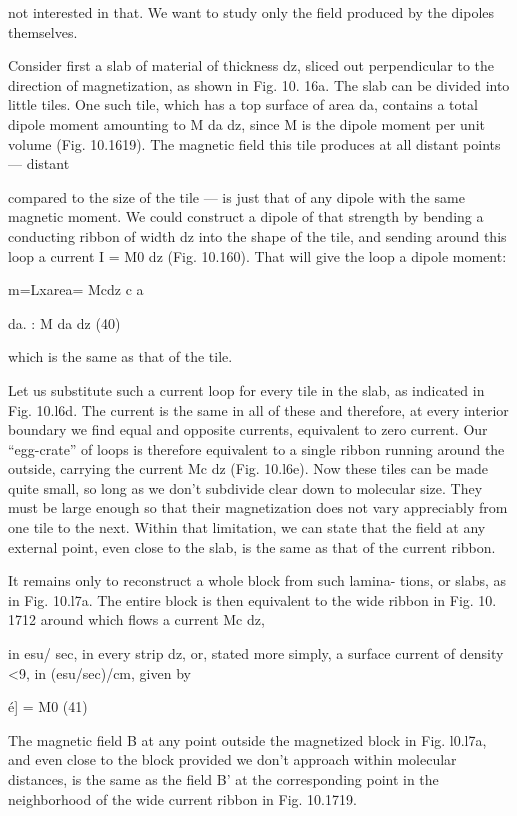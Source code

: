 {{not interested in that. We want to study only the field produced
by the dipoles themselves.

Consider first a slab of material of thickness dz, sliced out perpendicular
to the direction of magnetization, as shown in Fig. 10. 16a.
The slab can be divided into little tiles. One such tile, which has a
top surface of area da, contains a total dipole moment amounting to
M da dz, since M is the dipole moment per unit volume (Fig. 10.1619).
The magnetic field this tile produces at all distant points --- distant

 

 

compared to the size of the tile --- is just that of any dipole with the
same magnetic moment. We could construct a dipole of that
strength by bending a conducting ribbon of width dz into the shape
of the tile, and sending around this loop a current I = M0 dz (Fig.
10.160). That will give the loop a dipole moment:

m=Lxarea= Mcdz
c a

da. : M da dz (40)

which is the same as that of the tile.

Let us substitute such a current loop for every tile in the slab, as
indicated in Fig. 10.l6d. The current is the same in all of these and
therefore, at every interior boundary we find equal and opposite
currents, equivalent to zero current. Our ``egg-crate'' of loops is
therefore equivalent to a single ribbon running around the outside,
carrying the current Mc dz (Fig. 10.l6e). Now these tiles can be
made quite small, so long as we don't subdivide clear down to molecular
size. They must be large enough so that their magnetization
does not vary appreciably from one tile to the next. Within that
limitation, we can state that the field at any external point, even close
to the slab, is the same as that of the current ribbon.

It remains only to reconstruct a whole block from such lamina-
tions, or slabs, as in Fig. 10.l7a. The entire block is then equivalent
to the wide ribbon in Fig. 10. 1712 around which flows a current Mc dz,

in esu/ sec, in every strip dz, or, stated more simply, a surface current
of density <9, in (esu/sec)/cm, given by

é] = M0 (41)

The magnetic field B at any point outside the magnetized block in
Fig. l0.l7a, and even close to the block provided we don't approach
within molecular distances, is the same as the field B' at the corresponding
point in the neighborhood of the wide current ribbon in
Fig. 10.1719.

}}
